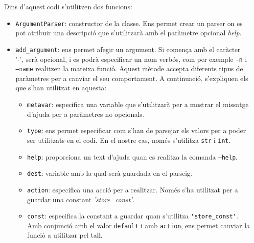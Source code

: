  Dins d'aquest codi s'utilitzen dos funcions:
 \begin{itemize}
 	\item \texttt{ArgumentParser}: constructor de la classe. Ens permet crear un parser on es 
 	pot atribuir una descripció que s'utilitzarà amb el paràmetre opcional \textit{help}.
 	
 	\item \verb|add_argument|: ens permet afegir un argument. Si comença amb el caràcter
 	'-', serà opcional, i es podrà especificar un nom verbós, com per exemple \texttt{-n} i
 	\texttt{--name} realitzen la mateixa funció. Aquest mètode accepta diferents tipus de 
 	paràmetres per a canviar el seu comportament. A continuació, s'expliquen els que s'han utilitzat
 	en aquesta:
 		\begin{itemize}
 			\item \texttt{metavar}: especifica una variable que s'utilitzarà per a mostrar el missatge
 			d'ajuda per a paràmetres no opcionals.
 			
 			\item \texttt{type}: ens permet especificar com s'han de parsejar els valors per a poder
 			ser utilitzats en el codi. En el nostre cas, només s'utilitza \texttt{str} i \texttt{int}.
 			
 			\item \texttt{help}: proporciona un text d'ajuda quan es realitza la comanda \texttt{--help}.
 			
 			\item \texttt{dest}: variable amb la qual serà guardada en el parseig.
 			
 			\item \texttt{action}: especifica una acció per a realitzar. Només s'ha utilitzat per a 
 			guardar una constant \textit{'store\_const'}.
 		
 			\item \texttt{const}: especifica la constant a guardar quan s'utilitza \verb|'store_const'|.
 			Amb conjunció amb el valor \texttt{default} i amb \texttt{action}, ens permet canviar 
 			la funció a utilitzar pel tall.
 		\end{itemize}
 \end{itemize}
